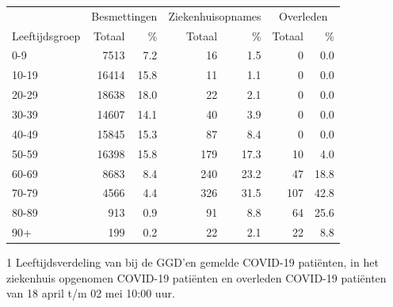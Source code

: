 \documentclass[
  english,
  man,floatsintext]{apa6}
\begin{document}
\begin{table}
\centering\begingroup\fontsize{11}{13}\selectfont

\begin{threeparttable}
\begin{tabular}{lrrrrrr}
\toprule
\multicolumn{1}{c}{ } & \multicolumn{2}{c}{Besmettingen} & \multicolumn{2}{c}{Ziekenhuisopnames} & \multicolumn{2}{c}{Overleden} \\
\cmidrule(l{3pt}r{3pt}){2-3} \cmidrule(l{3pt}r{3pt}){4-5} \cmidrule(l{3pt}r{3pt}){6-7}
Leeftijdsgroep & Totaal & \% & Totaal & \% & Totaal & \%\\
\midrule
0-9 & 7513 & 7.2 & 16 & 1.5 & 0 & 0.0\\
10-19 & 16414 & 15.8 & 11 & 1.1 & 0 & 0.0\\
20-29 & 18638 & 18.0 & 22 & 2.1 & 0 & 0.0\\
30-39 & 14607 & 14.1 & 40 & 3.9 & 0 & 0.0\\
40-49 & 15845 & 15.3 & 87 & 8.4 & 0 & 0.0\\
50-59 & 16398 & 15.8 & 179 & 17.3 & 10 & 4.0\\
60-69 & 8683 & 8.4 & 240 & 23.2 & 47 & 18.8\\
70-79 & 4566 & 4.4 & 326 & 31.5 & 107 & 42.8\\
80-89 & 913 & 0.9 & 91 & 8.8 & 64 & 25.6\\
90+ & 199 & 0.2 & 22 & 2.1 & 22 & 8.8\\
\bottomrule
\end{tabular}
\begin{tablenotes}
\item[1] Leeftijdsverdeling van bij de GGD’en gemelde COVID-19 patiënten, in het ziekenhuis opgenomen COVID-19 patiënten en overleden COVID-19 patiënten van 18 april t/m 02 mei 10:00 uur.
\end{tablenotes}
\end{threeparttable}
\endgroup{}
\end{table}

\newpage
\end{document}
